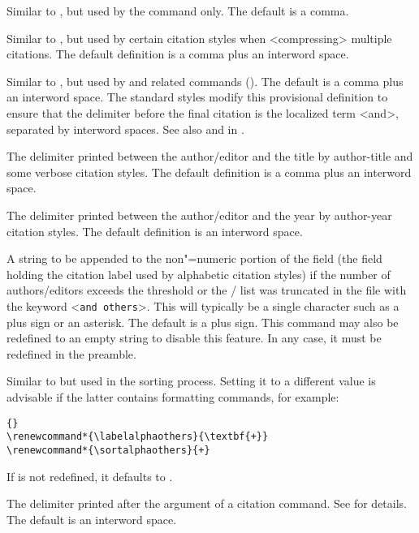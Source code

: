 \documentclass{ltxdockit}[2011/03/25]
\begin{document}
\begin{ltxsyntax}
Similar to , but used by the  command only. The default is a comma.

Similar to , but used by certain citation styles when <compressing> multiple citations. The default definition is a comma plus an interword space.

Similar to , but used by  and related commands (). The default is a comma plus an interword space. The standard styles modify this provisional definition to ensure that the delimiter before the final citation is the localized term <and>, separated by interword spaces. See also  and  in .

The delimiter printed between the author\slash editor and the title by author-title and some verbose citation styles. The default definition is a comma plus an interword space.

The delimiter printed between the author\slash editor and the year by author-year citation styles. The default definition is an interword space.

A string to be appended to the non"=numeric portion of the  field (\ie the field holding the citation label used by alphabetic citation styles) if the number of authors\slash editors exceeds the  threshold or the \slash {} list was truncated in the  file with the keyword <\texttt{and others}>. This will typically be a single character such as a plus sign or an asterisk. The default is a plus sign. This command may also be redefined to an empty string to disable this feature. In any case, it must be redefined in the preamble.

\BiberOnlyMark
Similar to  but used in the sorting process. Setting it to a different value is advisable if the latter contains formatting commands, for example:

\begin{lstlisting}[style=latex]{}
\renewcommand*{\labelalphaothers}{\textbf{+}}
\renewcommand*{\sortalphaothers}{+}
\end{lstlisting}
%
If  is not redefined, it defaults to .

The delimiter printed after the  argument of a citation command. See  for details. The default is an interword space.


\end{ltxsyntax}
\end{document}
